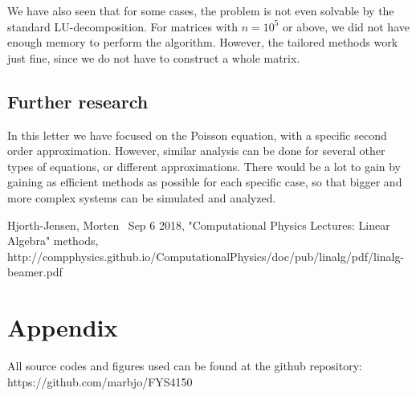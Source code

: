 \documentclass{emulateapj}
\begin{document}
We have also seen that for some cases, the problem is not even solvable by the standard LU-decomposition. For matrices with $n=10^5$ or above, we did not have enough memory to perform the algorithm. However, the tailored methods work just fine, since we do not have to construct a whole matrix.

\subsection{Further research}
In this letter we have focused on the Poisson equation, with a specific second order approximation. However, similar analysis can be done for several other types of equations, or different approximations. There would be a lot to gain by gaining as efficient methods as possible for each specific case, so that bigger and more complex systems can be simulated and analyzed.

\begin{thebibliography}{}
 Hjorth-Jensen, Morten \, Sep 6 2018, "Computational Physics Lectures: Linear Algebra"
methods, http://compphysics.github.io/ComputationalPhysics/doc/pub/linalg/pdf/linalg-beamer.pdf

\end{thebibliography}

\section{Appendix}
All source codes and figures used can be found at the github repository: https://github.com/marbjo/FYS4150
\end{document}
